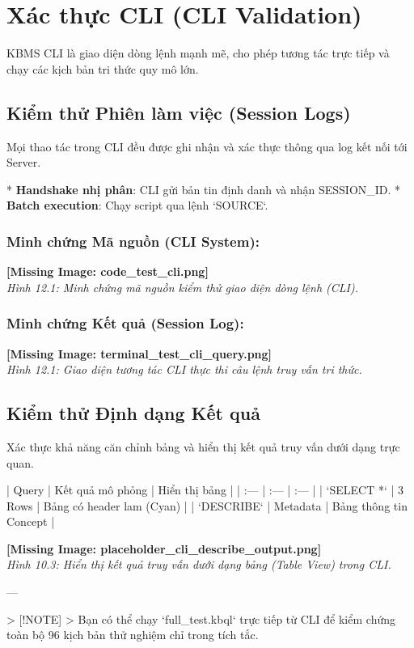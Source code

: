 \section{Xác thực CLI (CLI Validation)}

KBMS CLI là giao diện dòng lệnh mạnh mẽ, cho phép tương tác trực tiếp và chạy các kịch bản tri thức quy mô lớn.

\subsection{Kiểm thử Phiên làm việc (Session Logs)}

Mọi thao tác trong CLI đều được ghi nhận và xác thực thông qua log kết nối tới Server.

*   \textbf{Handshake nhị phân}: CLI gửi bản tin định danh và nhận SESSION\_ID.
*   \textbf{Batch execution}: Chạy script qua lệnh `SOURCE`.

\subsubsection{Minh chứng Mã nguồn (CLI System):}
\textbf{[Missing Image: code_test_cli.png]}\\ \textit{Hình 12.1: Minh chứng mã nguồn kiểm thử giao diện dòng lệnh (CLI).}

\subsubsection{Minh chứng Kết quả (Session Log):}
\textbf{[Missing Image: terminal_test_cli_query.png]}\\ \textit{Hình 12.1: Giao diện tương tác CLI thực thi câu lệnh truy vấn tri thức.}

\subsection{Kiểm thử Định dạng Kết quả}

Xác thực khả năng căn chỉnh bảng và hiển thị kết quả truy vấn dưới dạng trực quan.

| Query | Kết quả mô phỏng | Hiển thị bảng |
| :--- | :--- | :--- |
| `SELECT *` | 3 Rows | Bảng có header lam (Cyan) |
| `DESCRIBE` | Metadata | Bảng thông tin Concept |

\textbf{[Missing Image: placeholder_cli_describe_output.png]}\\ \textit{Hình 10.3: Hiển thị kết quả truy vấn dưới dạng bảng (Table View) trong CLI.}

---

> [!NOTE]
> Bạn có thể chạy `full\_test.kbql` trực tiếp từ CLI để kiểm chứng toàn bộ 96 kịch bản thử nghiệm chỉ trong tích tắc.

